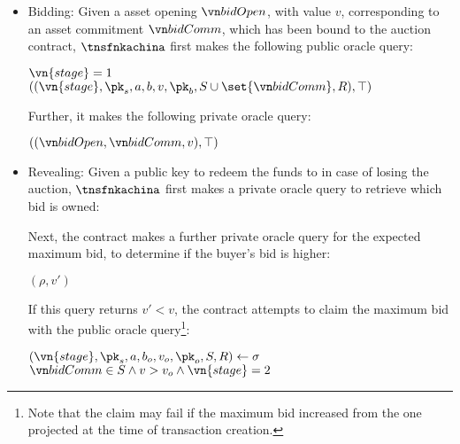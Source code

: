 \begin{itemize}
  \item Bidding: Given a asset opening $\openbid$, with value
    $v$, corresponding to an asset commitment $\bidcomm$, which has been
    bound to the auction contract, $\tnsfnkachina$ first makes the following public
    oracle query:
    \begin{algorithmic}
        \State \Assert $\vn{stage} = 1$
        \State \Return $((\vn{stage}, \pk_s, a, b, v, \pk_b, S \cup \set{\bidcomm}, R),\top)$
      \EndFunction
    \end{algorithmic}
    Further, it makes the following private oracle query:
    \begin{algorithmic}
        \State \Return $((\openbid, \bidcomm, v),\top)$
      \EndFunction
    \end{algorithmic}
  \item Revealing: Given a public key to redeem the funds to in case of losing
    the auction, $\tnsfnkachina$ first makes a private oracle query to retrieve which bid is owned:
    \begin{algorithmic}
      \EndFunction
    \end{algorithmic}
    Next, the contract makes a further private oracle query for the expected maximum bid,
    to determine if the buyer's bid is higher:
    \begin{algorithmic}
        \State \Return $(\rho, v')$
      \EndFunction
    \end{algorithmic}
    If this query returns $v' < v$, the contract attempts to claim the maximum
    bid with the public oracle query\footnote{Note that the claim may fail if
      the maximum bid increased from the one projected at the time of
      transaction creation.}:
    \begin{algorithmic}
        \State \Let $(\vn{stage}, \pk_s, a, b_o, v_o,\allowbreak \pk_o, S, R)
          \gets \sigma$
        \State \Assert $\bidcomm \in S \land v > v_o \land \vn{stage} = 2$
\end{algorithmic}
\end{itemize}
